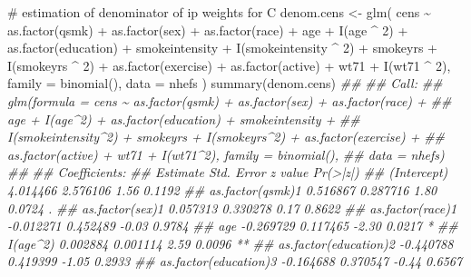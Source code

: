 \documentclass[
  10pt,
  a4paper,
]{book}
\newenvironment{Shaded}{\begin{snugshade}}{\end{snugshade}}
\newcommand{\AttributeTok}[1]{\textcolor[rgb]{0.40,0.45,0.13}{#1}}
\newcommand{\CommentTok}[1]{\textcolor[rgb]{0.37,0.37,0.37}{#1}}
\newcommand{\DecValTok}[1]{\textcolor[rgb]{0.68,0.00,0.00}{#1}}
\newcommand{\DocumentationTok}[1]{\textcolor[rgb]{0.37,0.37,0.37}{\textit{#1}}}
\newcommand{\FunctionTok}[1]{\textcolor[rgb]{0.28,0.35,0.67}{#1}}
\newcommand{\NormalTok}[1]{\textcolor[rgb]{0.00,0.46,0.62}{#1}}
\newcommand{\OtherTok}[1]{\textcolor[rgb]{0.00,0.46,0.62}{#1}}
\newcommand{\SpecialCharTok}[1]{\textcolor[rgb]{0.37,0.37,0.37}{#1}}
\begin{document}
\begin{Shaded}
\begin{Highlighting}[]
\CommentTok{\# estimation of denominator of ip weights for C}
\NormalTok{denom.cens }\OtherTok{\textless{}{-}} \FunctionTok{glm}\NormalTok{(}
\NormalTok{  cens }\SpecialCharTok{\textasciitilde{}} \FunctionTok{as.factor}\NormalTok{(qsmk) }\SpecialCharTok{+} \FunctionTok{as.factor}\NormalTok{(sex) }\SpecialCharTok{+}
    \FunctionTok{as.factor}\NormalTok{(race) }\SpecialCharTok{+}\NormalTok{ age }\SpecialCharTok{+} \FunctionTok{I}\NormalTok{(age }\SpecialCharTok{\^{}} \DecValTok{2}\NormalTok{) }\SpecialCharTok{+}
    \FunctionTok{as.factor}\NormalTok{(education) }\SpecialCharTok{+}\NormalTok{ smokeintensity }\SpecialCharTok{+}
    \FunctionTok{I}\NormalTok{(smokeintensity }\SpecialCharTok{\^{}} \DecValTok{2}\NormalTok{) }\SpecialCharTok{+}\NormalTok{ smokeyrs }\SpecialCharTok{+} \FunctionTok{I}\NormalTok{(smokeyrs }\SpecialCharTok{\^{}} \DecValTok{2}\NormalTok{) }\SpecialCharTok{+}
    \FunctionTok{as.factor}\NormalTok{(exercise) }\SpecialCharTok{+} \FunctionTok{as.factor}\NormalTok{(active) }\SpecialCharTok{+}\NormalTok{ wt71 }\SpecialCharTok{+} \FunctionTok{I}\NormalTok{(wt71 }\SpecialCharTok{\^{}} \DecValTok{2}\NormalTok{),}
  \AttributeTok{family =} \FunctionTok{binomial}\NormalTok{(),}
  \AttributeTok{data =}\NormalTok{ nhefs}
\NormalTok{)}
\FunctionTok{summary}\NormalTok{(denom.cens)}
\DocumentationTok{\#\# }
\DocumentationTok{\#\# Call:}
\DocumentationTok{\#\# glm(formula = cens \textasciitilde{} as.factor(qsmk) + as.factor(sex) + as.factor(race) + }
\DocumentationTok{\#\#     age + I(age\^{}2) + as.factor(education) + smokeintensity + }
\DocumentationTok{\#\#     I(smokeintensity\^{}2) + smokeyrs + I(smokeyrs\^{}2) + as.factor(exercise) + }
\DocumentationTok{\#\#     as.factor(active) + wt71 + I(wt71\^{}2), family = binomial(), }
\DocumentationTok{\#\#     data = nhefs)}
\DocumentationTok{\#\# }
\DocumentationTok{\#\# Coefficients:}
\DocumentationTok{\#\#                        Estimate Std. Error z value Pr(\textgreater{}|z|)   }
\DocumentationTok{\#\# (Intercept)            4.014466   2.576106    1.56   0.1192   }
\DocumentationTok{\#\# as.factor(qsmk)1       0.516867   0.287716    1.80   0.0724 . }
\DocumentationTok{\#\# as.factor(sex)1        0.057313   0.330278    0.17   0.8622   }
\DocumentationTok{\#\# as.factor(race)1      {-}0.012271   0.452489   {-}0.03   0.9784   }
\DocumentationTok{\#\# age                   {-}0.269729   0.117465   {-}2.30   0.0217 * }
\DocumentationTok{\#\# I(age\^{}2)               0.002884   0.001114    2.59   0.0096 **}
\DocumentationTok{\#\# as.factor(education)2 {-}0.440788   0.419399   {-}1.05   0.2933   }
\DocumentationTok{\#\# as.factor(education)3 {-}0.164688   0.370547   {-}0.44   0.6567   }

\end{Highlighting}
\end{Shaded}
\end{document}
